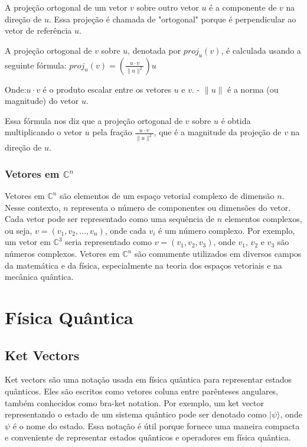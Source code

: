 \documentclass[12pt]{article}
\begin{document}
A projeção ortogonal de um vetor \(v\) sobre outro vetor \(u\) é a componente de \(v\) na direção de \(u\). Essa projeção é chamada de "ortogonal" porque é perpendicular ao vetor de referência \(u\).

A projeção ortogonal de \(v\) sobre \(u\), denotada por \(proj_{u}(v)\), é calculada usando a seguinte fórmula: \(proj_{u}(v) = \left( \frac{u \cdot v}{\|u\|^2} \right) u\)


Onde:\(u  \cdot  v \) é o produto escalar entre os vetores \( u \) e \( v \).
- \( \| u \| \) é a norma (ou magnitude) do vetor \( u \).

Essa fórmula nos diz que a projeção ortogonal de \( v \) sobre \( u \) é obtida multiplicando o vetor \( u \) pela fração \(\frac{u \cdot v}{\|u\|^2}\), que é a magnitude da projeção de \(v \) na direção de \(u\).

\subsubsection{Vetores em $\mathbb{C}^n$}

Vetores em $\mathbb{C}^n$ são elementos de um espaço vetorial complexo de dimensão $n$. Nesse contexto, $n$ representa o número de componentes ou dimensões do vetor. Cada vetor pode ser representado como uma sequência de $n$ elementos complexos, ou seja, $v = (v_1, v_2, \ldots, v_n)$, onde cada $v_i$ é um número complexo. Por exemplo, um vetor em $\mathbb{C}^3$ seria representado como $v = (v_1, v_2, v_3)$, onde $v_1$, $v_2$ e $v_3$ são números complexos. Vetores em $\mathbb{C}^n$ são comumente utilizados em diversos campos da matemática e da física, especialmente na teoria dos espaços vetoriais e na mecânica quântica.

\newpage
\section{Física Quântica}

\subsection{Ket Vectors}


Ket vectors são uma notação usada em física quântica para representar estados quânticos. Eles são escritos como vetores coluna entre parênteses angulares, também conhecidos como bra-ket notation. Por exemplo, um ket vector representando o estado de um sistema quântico pode ser denotado como $|\psi\rangle$, onde $\psi$ é o nome do estado. Essa notação é útil porque fornece uma maneira compacta e conveniente de representar estados quânticos e operadores em física quântica.
\end{document}
